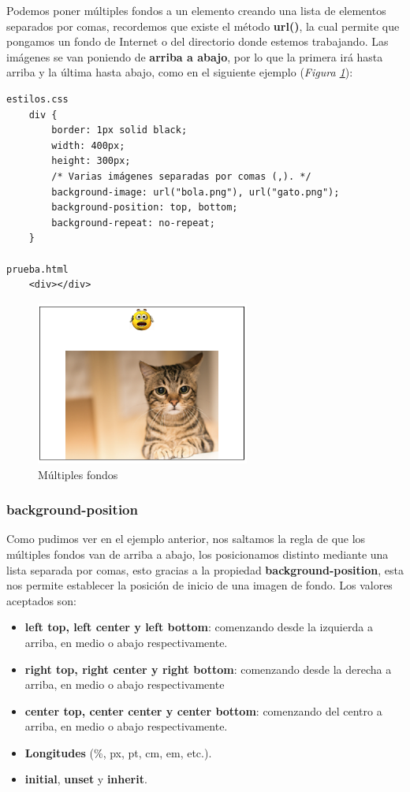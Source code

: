 Podemos poner múltiples fondos a un elemento creando una lista de elementos separados por comas, recordemos que existe el método \textbf{url()}, la cual permite que pongamos un fondo de Internet o del directorio donde estemos trabajando. Las imágenes se van poniendo de \textbf{arriba a abajo}, por lo que la primera irá hasta arriba y la última hasta abajo, como en el siguiente ejemplo (\textit{Figura \ref{fig: 50}}):
\begin{lstlisting}
estilos.css
    div {
        border: 1px solid black;
        width: 400px;
        height: 300px;
        /* Varias imágenes separadas por comas (,). */
        background-image: url("bola.png"), url("gato.png");
        background-position: top, bottom;
        background-repeat: no-repeat;
    }

prueba.html
    <div></div>
\end{lstlisting}
\begin{figure}[H]
    \centering
    \caption{Múltiples fondos}
    \label{fig: 50}
    \includegraphics[width=7cm]{ss/multiples-bordes.png}
\end{figure}


\subsubsection{background-position}

Como pudimos ver en el ejemplo anterior, nos saltamos la regla de que los múltiples fondos van de arriba a abajo, los posicionamos distinto mediante una lista separada por comas, esto gracias a la propiedad \textbf{background-position}, esta nos permite establecer la posición de inicio de una imagen de fondo. Los valores aceptados son:
\begin{itemize}
    \item \textbf{left top, left center y left bottom}: comenzando desde la izquierda a arriba, en medio o abajo respectivamente.
    \item \textbf{right top, right center y right bottom}: comenzando desde la derecha a arriba, en medio o abajo respectivamente
    \item \textbf{center top, center center y center bottom}: comenzando del centro a arriba, en medio o abajo respectivamente.
    \item \textbf{Longitudes} (\%, px, pt, cm, em, etc.).
    \item \textbf{initial}, \textbf{unset} y \textbf{inherit}.
\end{itemize}


